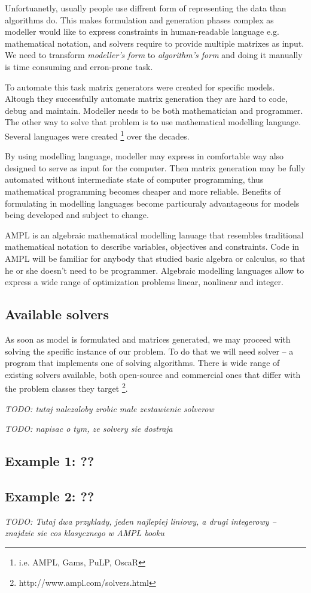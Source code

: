 Unfortuanetly, usually people use diffrent form of representing the data than algorithms do. This makes formulation and generation phases complex as modeller would like to express constraints in human-readable language e.g. mathematical notation, and solvers require to provide multiple matrixes as input. We need to transform \emph{modeller's form} to \emph{algorithm's form} and doing it manually is time consuming and erron-prone task.

To automate this task matrix generators were created for specific models. Altough they successfully automate matrix generation they are hard to code, debug and maintain. Modeller needs to be both mathematician and programmer. The other way to solve that problem is to use mathematical modelling language. Several languages were created \footnote{i.e. AMPL, Gams, PuLP, OscaR} over the decades. 

By using modelling language, modeller may express in comfortable way also designed to serve as input for the computer. Then matrix generation may be fully automated without intermediate state of computer programming, thus mathematical programming becomes cheaper and more reliable. Benefits of formulating in modelling languages become particuraly advantageous for models being developed and subject to change.

AMPL is an algebraic mathematical modelling lanuage that resembles traditional mathematical notation to describe variables, objectives and constraints. Code in AMPL will be familiar for anybody that studied basic algebra or calculus, so that he or she doesn't need to be programmer. Algebraic modelling languages allow to express a wide range of optimization problems linear, nonlinear and integer.

\subsection{Available solvers}

As soon as model is formulated and matrices generated, we may proceed with solving the specific instance of our problem. To do that we will need solver -- a program that implements one of solving algorithms. There is wide range of existing solvers available, both open-source and commercial ones that differ with the problem classes they target \footnote{http://www.ampl.com/solvers.html}. 

\emph{TODO: tutaj nalezaloby zrobic male zestawienie solverow}

\emph{TODO: napisac o tym, ze solvery sie dostraja}

\subsection{Example 1: ??}
\subsection{Example 2: ??}

\emph{TODO: Tutaj dwa przyklady, jeden najlepiej liniowy, a drugi integerowy – znajdzie sie cos klasycznego w AMPL booku}